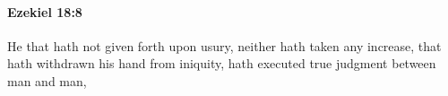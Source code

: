 
		\paragraph{Ezekiel 18:8} %
			\label{EZEKIEL-18-8}

			He that hath not given forth upon usury, neither hath taken any increase, that hath withdrawn his hand from iniquity, hath executed true judgment between man and man,


